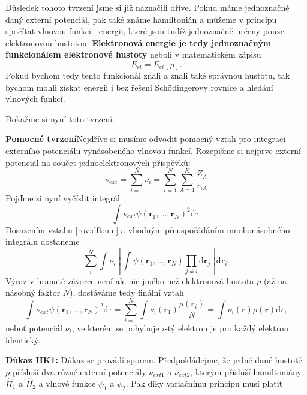 \bigskip
Důsledek tohoto tvrzení jsme si již naznačili dříve. Pokud máme jednoznačně daný externí potenciál, pak také známe hamiltonián a můžeme v principu spočítat vlnovou funkci i energii, které jsou tudíž jednoznačně určeny pouze elektronovou hustotou. \textbf{Elektronová energie je tedy jednoznačným funkcionálem elektronové hustoty} neboli v matematickém zápisu
\begin{equation}
E_{el}=E_{el}[\rho] .
\end{equation}
Pokud bychom tedy tento funkcionál znali a znali také správnou hustotu, tak bychom mohli získat energii i bez řešení Sch\"{o}dingerovy rovnice a hledání vlnových funkcí.

\bigskip
Dokažme si nyní toto tvrzení. 

\textbf{Pomocné tvrzení}Nejdříve si musíme odvodit pomocný vztah pro integraci externího potenciálu vynásobeného vlnovou funkcí.
Rozepišme si nejprve externí potenciál na součet jednoelektronových příspěvků:
\begin{equation}
\nu_{ext}=\sum_{i=1}^N \nu_i = \sum_{i=1}^N \sum_{A=1}^K \frac{Z_A}{r_{iA}}  
\label{rov:dft:nui}
\end{equation}
Pojďme si nyní vyčíslit integrál
\begin{equation}
\int \nu_{ext} \psi(\textbf{r}_1,...,\textbf{r}_N)^2\mathrm{d}\tau .
\end{equation}
Dosazením vztahu \eqref{rov:dft:nui} a vhodným přeuspořádáním mnohonásobného integrálu dostaneme
\begin{equation}
\sum_i^N \int \nu_i \left[\int \psi(\mathbf{r}_1,...,\mathbf{r}_N)\prod_{j\neq i}\mathrm{d}\textbf{r}_j\right] \mathrm{d}\textbf{r}_i .
\end{equation}
Výraz v hranaté závorce není ale nic jiného než elektronová hustota $\rho$ (až na násobný faktor $N$), dostáváme tedy finální vztah
\begin{equation}
\int \nu_{ext} \psi(\textbf{r}_1,...,\textbf{r}_N)^2\mathrm{d}\tau = \sum_{i=1}^N \int \nu_i(\textbf{r}_1)\frac{\rho(\textbf{r}_i)}{N}= \int \nu_i(\textbf{r})\rho(\textbf{r}) \mathrm{d}r ,
\label{rov:dft:intnupsi}
\end{equation}
neboť potenciál $\nu_i$, ve kterém se pohybuje $i$-tý elektron je pro každý elektron identický.

\bigskip 
\textbf{Důkaz HK1:} Důkaz se provádí sporem. Předpokládejme, že jedné dané hustotě $\rho$ přísluší dva různé externí potenciály $\nu_{ext1}$ a $\nu_{ext2}$, kterým přísluší hamiltoniány $\hat{H}_1$ a $\hat{H}_2$ a vlnové funkce $\psi_1$ a $\psi_2$.  Pak díky variačnímu principu musí platit

